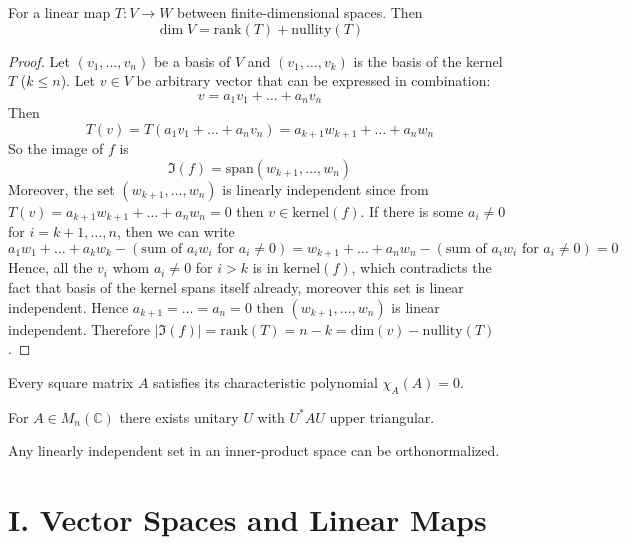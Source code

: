 \documentclass[11pt]{article}
\begin{document}
\begin{boxedlemma}\label{lem:ranknull}
For a linear map $T:V\to W$ between finite-dimensional spaces. Then $$\dim V=\mathrm{rank}(T)+\mathrm{nullity}(T)$$
\end{boxedlemma}
\begin{proof} Let $(v_1,\dots,v_n)$ be a basis of $V$ and $(v_1,\dots,v_k)$ is the basis of the kernel $T$ ($k \leq n$). Let $v \in V$ be arbitrary vector that can be expressed in combination:
\[
    v = a_1v_1 + \dots + a_nv_n
\]
Then 
\[
    T(v) = T(a_1v_1 + \dots + a_nv_n) = a_{k + 1}w_{k + 1} + \dots + a_nw_n
\]
So the image of $f$ is 
\[
    \Im(f) = \mathrm{span}(w_{k + 1}, \dots, w_n)
\]
Moreover, the set $(w_{k + 1}, \dots, w_n)$ is linearly independent since from $T(v)= a_{k + 1}w_{k + 1} + \dots + a_nw_n = 0$ then $v \in \mathrm{kernel}(f)$. If there is some $a_i \neq 0$ for $i = k + 1,\dots, n$, then we can write 
\[
    a_1w_1 + \dots + a_kw_k - (\text{sum of $a_iw_i$ for }a_i \neq 0) = w_{k + 1} + \dots + a_nw_n - (\text{sum of $a_iw_i$ for }a_i\neq0 ) = 0
\]
Hence, all the $v_i$ whom $a_i \neq 0$ for $i > k$ is in $\mathrm{kernel}(f)$, which contradicts the fact that basis of the kernel spans itself already, moreover this set is linear independent. Hence $a_{k + 1} = \dots = a_n = 0$ then $(w_{k + 1},\dots,w_n)$ is linear independent. Therefore $|\Im(f)| = \mathrm{rank}(T) = n - k = \mathrm{dim}(v) - \mathrm{nullity}(T)$.
\end{proof}
\begin{lemma}\label{lem:CH}
Every square matrix $A$ satisfies its characteristic polynomial $\chi_A(A)=0$.
\end{lemma}

\begin{lemma}\label{lem:schur}
For $A\in M_n(\mathbb{C})$ there exists unitary $U$ with $U^*AU$ upper triangular.
\end{lemma}

\begin{lemma}\label{lem:GS}
Any linearly independent set in an inner-product space can be orthonormalized.
\end{lemma}



\section*{I. Vector Spaces and Linear Maps}
\end{document}
